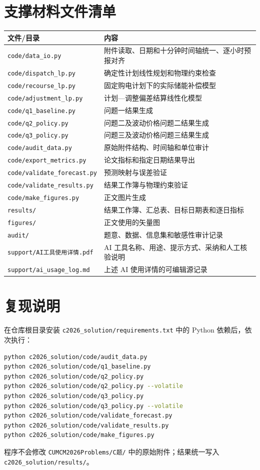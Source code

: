 \documentclass[withoutpreface]{cumcmthesis}
\begin{document}
\newpage
\begin{appendices}
\section{支撑材料文件清单}
\begin{tabularx}{\textwidth}{lL}
\toprule
文件/目录 & 内容\\
\midrule
\texttt{code/data\_io.py} & 附件读取、日期和十分钟时间轴统一、逐小时预报对齐\\
\texttt{code/dispatch\_lp.py} & 确定性计划线性规划和物理约束检查\\
\texttt{code/recourse\_lp.py} & 固定购电计划下的实际储能补偿模型\\
\texttt{code/adjustment\_lp.py} & 计划—调整偏差结算线性化模型\\
\texttt{code/q1\_baseline.py} & 问题一结果生成\\
\texttt{code/q2\_policy.py} & 问题二及波动价格问题二结果生成\\
\texttt{code/q3\_policy.py} & 问题三及波动价格问题三结果生成\\
\texttt{code/audit\_data.py} & 原始附件结构、时间轴和单位审计\\
\texttt{code/export\_metrics.py} & 论文指标和指定日期结果导出\\
\texttt{code/validate\_forecast.py} & 预测映射与误差验证\\
\texttt{code/validate\_results.py} & 结果工作簿与物理约束验证\\
\texttt{code/make\_figures.py} & 正文图片生成\\
\texttt{results/} & 结果工作簿、汇总表、目标日期表和逐日指标\\
\texttt{figures/} & 正文使用的矢量图\\
\texttt{audit/} & 题意、数据、信息集和敏感性审计记录\\
\texttt{support/AI工具使用详情.pdf} & AI 工具名称、用途、提示方式、采纳和人工核验说明\\
\texttt{support/ai\_usage\_log.md} & 上述 AI 使用详情的可编辑源记录\\
\bottomrule
\end{tabularx}

\section{复现说明}
在仓库根目录安装 \texttt{c2026\_solution/requirements.txt} 中的 Python 依赖后，依次执行：
\begin{lstlisting}[language=bash]
python c2026_solution/code/audit_data.py
python c2026_solution/code/q1_baseline.py
python c2026_solution/code/q2_policy.py
python c2026_solution/code/q2_policy.py --volatile
python c2026_solution/code/q3_policy.py
python c2026_solution/code/q3_policy.py --volatile
python c2026_solution/code/validate_forecast.py
python c2026_solution/code/validate_results.py
python c2026_solution/code/make_figures.py
\end{lstlisting}
程序不会修改 \texttt{CUMCM2026Problems/C题/} 中的原始附件；结果统一写入 \texttt{c2026\_solution/results/}。


\end{appendices}
\end{document}
